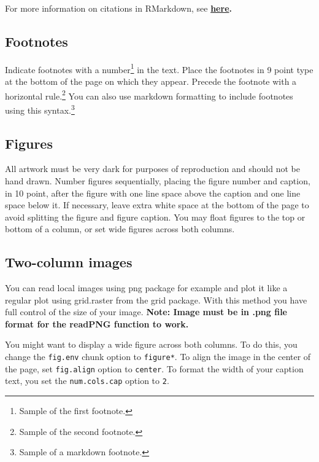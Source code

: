 \documentclass[10pt, letterpaper]{article}
\begin{document}
For more information on citations in RMarkdown, see
\textbf{\href{http://rmarkdown.rstudio.com/authoring_bibliographies_and_citations.html\#citations}{here}.}

\hypertarget{footnotes}{%
\subsection{Footnotes}\label{footnotes}}

Indicate footnotes with a number\footnote{Sample of the first
footnote.} in the text. Place the footnotes in 9 point type at the
bottom of the page on which they appear. Precede the footnote with a
horizontal rule.\footnote{Sample of the second footnote.} You can also
use markdown formatting to include footnotes using this
syntax.\footnote{Sample of a markdown footnote.}

\hypertarget{figures}{%
\subsection{Figures}\label{figures}}

All artwork must be very dark for purposes of reproduction and should
not be hand drawn. Number figures sequentially, placing the figure
number and caption, in 10 point, after the figure with one line space
above the caption and one line space below it. If necessary, leave extra
white space at the bottom of the page to avoid splitting the figure and
figure caption. You may float figures to the top or bottom of a column,
or set wide figures across both columns.

\hypertarget{two-column-images}{%
\subsection{Two-column images}\label{two-column-images}}

You can read local images using png package for example and plot it like
a regular plot using grid.raster from the grid package. With this method
you have full control of the size of your image. \textbf{Note: Image
must be in .png file format for the readPNG function to work.}

You might want to display a wide figure across both columns. To do this,
you change the \texttt{fig.env} chunk option to \texttt{figure*}. To
align the image in the center of the page, set \texttt{fig.align} option
to \texttt{center}. To format the width of your caption text, you set
the \texttt{num.cols.cap} option to \texttt{2}.
\end{document}
